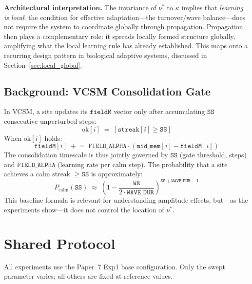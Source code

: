 \documentclass[11pt]{article}
\theoremstyle{remark}
\begin{document}
\textbf{Architectural interpretation.}
The invariance of $\nu^*$ to $\kappa$ implies that \emph{learning is local}: the
condition for effective adaptation---the turnover/wave balance---does not require
the system to coordinate globally through propagation. Propagation then plays a
complementary role: it spreads locally formed structure globally, amplifying what
the local learning rule has already established. This maps onto a recurring
design pattern in biological adaptive systems, discussed in Section~\ref{sec:local_global}.

\subsection{Background: VCSM Consolidation Gate}

In VCSM, a site updates its $\mathtt{fieldM}$ vector only after accumulating
$\mathtt{SS}$ consecutive unperturbed steps:
\begin{equation}
  \text{ok}[i] \;=\; [\mathtt{streak}[i] \geq \mathtt{SS}]
\end{equation}
When $\text{ok}[i]$ holds:
\begin{equation}
  \mathtt{fieldM}[i] \;\mathrel{+}=\; \mathtt{FIELD\_ALPHA}
    \cdot (\mathtt{mid\_mem}[i] - \mathtt{fieldM}[i])
\end{equation}
The consolidation timescale is thus jointly governed by $\mathtt{SS}$ (gate
threshold, steps) and $\mathtt{FIELD\_ALPHA}$ (learning rate per calm step).
The probability that a site achieves a calm streak $\geq \mathtt{SS}$ is
approximately:
\begin{equation}
  P_{\text{calm}}(\mathtt{SS}) \;\approx\;
    \left(1 - \frac{\mathtt{WR}}{2 \cdot \mathtt{WAVE\_DUR}}\right)^{\mathtt{SS} + \mathtt{WAVE\_DUR} - 1}
  \label{eq:pcalm}
\end{equation}
This baseline formula is relevant for understanding amplitude effects, but---as the
experiments show---it does not control the location of $\nu^*$.

\section{Shared Protocol}

All experiments use the Paper~7 Exp1 base configuration. Only the swept parameter
varies; all others are fixed at reference values.
\end{document}
